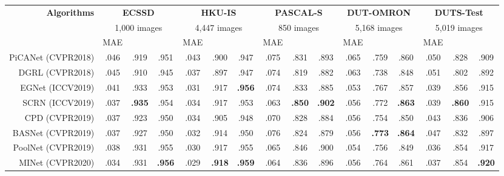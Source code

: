\documentclass[10pt,twocolumn,letterpaper]{article}
\begin{document}
\begin{table*}
\setlength{\tabcolsep}{4.6pt}
\small
\begin{center}
\begin{tabular}{|r|c|c|c|c|c|c|c|c|c|c|c|c|c|c|c|}
\hline
\multirow{3}{5em}{\textbf{Algorithms}}
& \multicolumn{3}{|c}{\textbf{ECSSD}} 
& \multicolumn{3}{|c}{\textbf{HKU-IS}} 
& \multicolumn{3}{|c}{\textbf{PASCAL-S}} 
& \multicolumn{3}{|c}{\textbf{DUT-OMRON}} 
& \multicolumn{3}{|c|}{\textbf{DUTS-Test}} \\
& \multicolumn{3}{|c}{1,000 images} 
& \multicolumn{3}{|c}{4,447 images} 
& \multicolumn{3}{|c}{850 images} 
& \multicolumn{3}{|c}{5,168 images} 
& \multicolumn{3}{|c|}{5,019 images} \\
\cline{2-16}
 & MAE &  &  
& MAE &  & 
& MAE &  & 
& MAE &  & 
& MAE &  &  \\
\hline\hline\rule{0pt}{2.2ex}
PiCANet (CVPR2018) & .046 & .919 & .951 & .043 & .900 & .947 & .075 & .831 & .893 & .065 & .759 & .860 & .050 & .828 & .909 \\

DGRL (CVPR2018) & .045 & .910 & .945 & .037 & .897 & .947 & .074 & .819 & .882 & .063 & .738 & .848 & .051 & .802 & .892 \\

EGNet (ICCV2019) & .041 & .933 & .953 & .031 & .917 & \textcolor{mblue}{\textbf{.956}} & .074 & .833 & .885 & .053 & .767 & .857 & .039 & .856 & .915 \\

SCRN (ICCV2019) & .037 & \textcolor{mblue}{\textbf{.935}} & .954 & .034 & .917 & .953 & .063 & \textcolor{mblue}{\textbf{.850}} & \textcolor{mblue}{\textbf{.902}} & .056 & .772 & \textcolor{mblue}{\textbf{.863}} & .039 & \textcolor{mblue}{\textbf{.860}} & .915 \\

CPD (CVPR2019) & .037 & .923 & .950 & .034 & .905 & .948 & .070 & .828 & .884 & .056 & .754 & .850 & .043 & .836 & .906 \\

BASNet (CVPR2019) & .037 & .927 & .950 & .032 & .914 & .950 & .076 & .824 & .879 & .056 & \textcolor{mblue}{\textbf{.773}} & \textcolor{mgreen}{\textbf{.864}} & .047 & .832 & .897 \\

PoolNet (CVPR2019) & .038 & .931 & .955 & .030 & .917 & .955 & .065 & .846 & .900 & .054 & .756 & .849 & .036 & .854 & .917 \\

MINet (CVPR2020) & .034 & .931 & \textcolor{mblue}{\textbf{.956}} & .029 & \textcolor{mblue}{\textbf{.918}} & \textcolor{mgreen}{\textbf{.959}} & .064 & .836 & .896 & .056 & .764 & .861 & .037 & .854 & \textcolor{mblue}{\textbf{.920}} \\


\end{tabular}
\end{center}
\end{table*}
\end{document}
